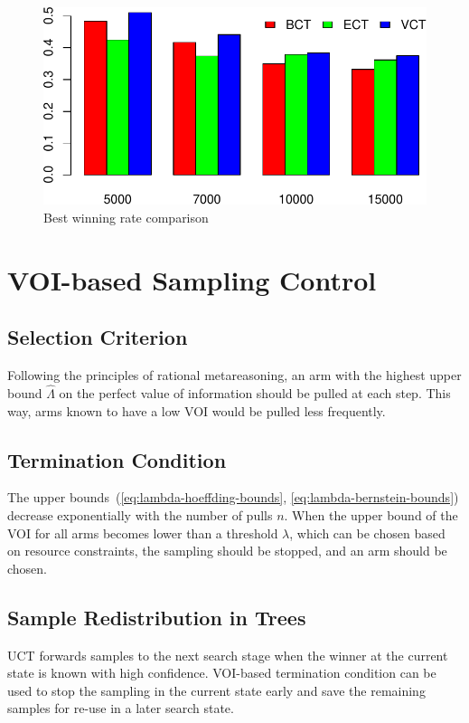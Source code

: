 \documentclass{article}
\begin{document}
\begin{figure}[h]
\centering
\includegraphics[scale=0.8]{bests-colorful.pdf}
\caption{Best winning rate comparison}
\label{fig:best-winning-rate}
\end{figure}

\section{VOI-based Sampling Control}

\subsection{Selection Criterion}

Following the principles of rational metareasoning, an arm with the highest upper bound $\hat
\Lambda$ on the perfect value of information should be pulled at each
step. This way, arms known to have a low VOI  would be pulled less frequently.

\subsection{Termination Condition}

The upper bounds~(\ref{eq:lambda-hoeffding-bounds}, \ref{eq:lambda-bernstein-bounds}) decrease exponentially with the
number of pulls $n$. When the upper bound of the VOI for all arms
becomes lower than a threshold $\lambda$, which can be chosen based on
resource constraints, the sampling should be stopped, and an arm should
be chosen.

\subsection{Sample Redistribution in Trees}

UCT forwards samples to the next search stage when the winner at the
current state is known with high confidence. VOI-based termination
condition can be used to stop the sampling in the current state early
and save the remaining samples for re-use in a later search state.
\end{document}
